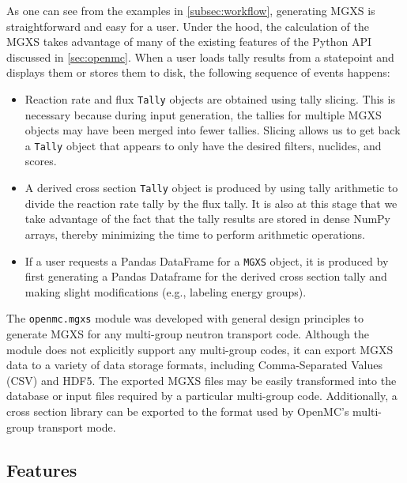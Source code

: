 As one can see from the examples in \cref{subsec:workflow}, generating MGXS is straightforward and easy for a user. Under the hood, the calculation of the MGXS takes advantage of many of the existing features of the Python API discussed in \cref{sec:openmc}. When a user loads tally results from a statepoint and displays them or stores them to disk, the following sequence of events happens:
\begin{itemize}[noitemsep]
\item Reaction rate and flux \texttt{Tally} objects are obtained using tally slicing. This is necessary because during input generation, the tallies for multiple MGXS objects may have been merged into fewer tallies. Slicing allows us to get back a \texttt{Tally} object that appears to only have the desired filters, nuclides, and scores.
\item A derived cross section \texttt{Tally} object is produced by using tally arithmetic to divide the reaction rate tally by the flux tally. It is also at this stage that we take advantage of the fact that the tally results are stored in dense NumPy arrays, thereby minimizing the time to perform arithmetic operations.
\item If a user requests a Pandas DataFrame for a \texttt{MGXS} object, it is produced by first generating a Pandas Dataframe for the derived cross section tally and making slight modifications (e.g., labeling energy groups).
\end{itemize}

The \texttt{openmc.mgxs} module was developed with general design principles to generate MGXS for any multi-group neutron transport code. Although the module does not explicitly support any multi-group codes, it can export MGXS data to a variety of data storage formats, including Comma-Separated Values (CSV) and HDF5. The exported MGXS files may be easily transformed into the database or input files required by a particular multi-group code. Additionally, a cross section library can be exported to the format used by OpenMC's multi-group transport mode.

\subsection{Features}
\label{sec:features}


